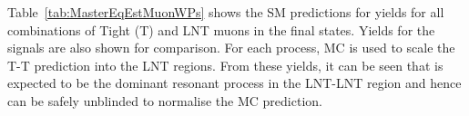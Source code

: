 Table~\ref{tab:MasterEqEstMuonWPs} shows the SM predictions for \Bhh yields for all combinations of Tight (T) and LNT muons in the final states.
Yields for the \Bmumu signals are also shown for comparison.  
For each process, MC is used to scale the T-T prediction into the LNT regions.
From these yields, it can be seen that \Bhh is expected to be the dominant resonant process in the LNT-LNT region and hence can be safely unblinded to normalise the MC prediction.   



